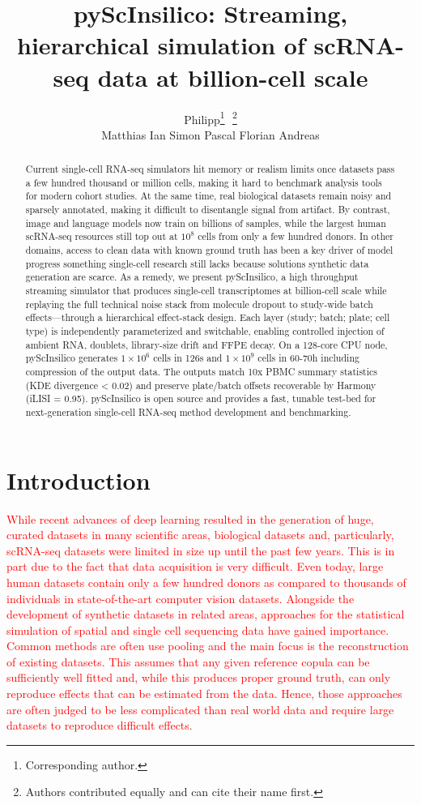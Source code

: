 \documentclass{article}
\title{pyScInsilico: Streaming, hierarchical simulation of scRNA-seq data at billion-cell scale}
\author{
  Philipp\thanks{Corresponding author.}\,\ \thanks{Authors contributed equally and can cite their name first.}\\
  \And
  Matthias\footnotemark[2]
  \And
  Ian
  \And
  Simon
  \And
  Pascal
  \And
  Florian
  \And
  Andreas\\
}
\newcommand{\phflo}[1]{\textcolor{red}{#1}}
\begin{document}
\maketitle

\begin{abstract}

Current single-cell RNA-seq simulators hit memory or realism limits once datasets pass a few hundred thousand or million cells, making it hard to benchmark analysis tools for modern cohort studies. At the same time, real biological datasets remain noisy and sparsely annotated, making it difficult to disentangle signal from artifact.
By contrast, image and language models now train on billions of samples, while the largest human scRNA-seq resources still top out at $10^8$ cells from only a few hundred donors. In other domains, access to clean data with known ground truth has been a key driver of model progress something single-cell research still lacks because solutions synthetic data generation are scarce. As a remedy, we present pyScInsilico, a high throughput streaming simulator that produces single-cell transcriptomes at billion-cell scale while replaying the full technical noise stack from molecule dropout to study-wide batch effects—through a hierarchical effect-stack design. Each layer (study; batch; plate; cell type) is independently parameterized and switchable, enabling controlled injection of ambient RNA, doublets, library-size drift and FFPE decay. On a 128-core CPU node, pyScInsilico generates $1\times 10^6$ cells in 126s and $1 \times 10^9$ cells in 60-70h including compression of the output data. The outputs match 10x PBMC summary statistics (KDE divergence < 0.02) and preserve plate/batch offsets recoverable by Harmony (iLISI = 0.95). pyScInsilico is open source and provides a fast, tunable test-bed for next-generation single-cell RNA-seq method development and benchmarking.

\end{abstract}


\section{Introduction}

\phflo{
While recent advances of deep learning resulted in the generation of huge, curated datasets in many scientific areas, biological datasets and, particularly, scRNA-seq datasets were limited in size up until the past few years. This is in part due to the fact that data acquisition is very difficult. Even today, large human datasets contain only a few hundred donors as compared to thousands of individuals in state-of-the-art computer vision datasets. Alongside the development of synthetic datasets in related areas, approaches for the statistical simulation of spatial and single cell sequencing data have gained importance. 
Common methods are often use pooling and the main focus is the reconstruction of existing datasets. This assumes that any given reference copula can be sufficiently well fitted and, while this produces proper ground truth, can only reproduce effects that can be estimated from the data. Hence, those approaches are often judged to be less complicated than real world data and require large datasets to reproduce difficult effects. }
\end{document}
